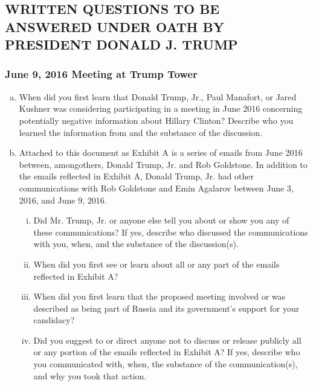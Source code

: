 \hr

\newpage

\subsection{WRITTEN QUESTIONS TO BE ANSWERED UNDER OATH BY PRESIDENT DONALD J. TRUMP}

\subsubsection{June 9, 2016 Meeting at Trump Tower}

\begin{enumerate}[a.]

\item When did you first learn that Donald Trump, Jr., Paul Manafort, or Jared Kushner was considering participating in a meeting in June 2016 concerning potentially negative information about Hillary Clinton?
Describe who you learned the information from and the substance of the discussion.

\item Attached to this document as Exhibit A is a series of emails from June 2016 between, amongothers, Donald Trump, Jr. and Rob Goldstone.
In addition to the emails reflected in Exhibit A, Donald Trump, Jr. had other communications with Rob Goldstone and Emin Agalarov between June 3, 2016, and June 9, 2016.

\begin{enumerate}[i.]

\item Did Mr. Trump, Jr. or anyone else tell you about or show you any of these communications?
If yes, describe who discussed the communications with you, when, and the substance of the discussion(s).

\item When did you first see or learn about all or any part of the emails reflected in Exhibit A?

\item When did you first learn that the proposed meeting involved or was described as being part of Russia and its government’s support for your candidacy?

\item Did you suggest to or direct anyone not to discuss or release publicly all or any portion of the emails reflected in Exhibit A? If yes, describe who you communicated with, when, the substance of the communication(s), and why you took that action.


\end{enumerate}
\end{enumerate}
